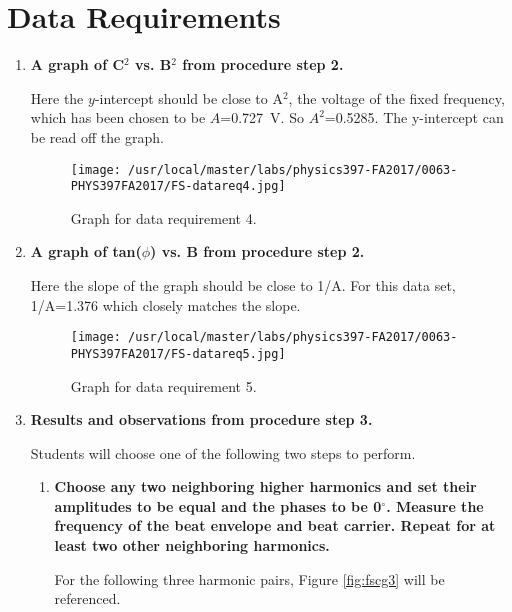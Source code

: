 \section{Data Requirements}
\begin{enumerate}[resume]
\item {\bf A graph of C$^2$ vs. B$^2$ from procedure step 2.}\newline

Here the $y$-intercept should be close to A$^2$, the voltage of the fixed frequency, which has been chosen to be $A$=0.727~V. So $A^2$=0.5285. The y-intercept can be read off the graph.

\begin{figure}[ht]
\texttt{[image: /usr/local/master/labs/physics397-FA2017/0063-PHYS397FA2017/FS-datareq4.jpg]}
\caption{Graph for data requirement 4.}
\label{fig:fscg1}
\end{figure}\vspace{-10mm}

\item {\bf A graph of tan($\phi$) vs. B from procedure step 2.}\newline

Here the slope of the graph should be close to 1/A. For this data set, 1/A=1.376 which closely matches the slope.

\begin{figure}[ht]
\texttt{[image: /usr/local/master/labs/physics397-FA2017/0063-PHYS397FA2017/FS-datareq5.jpg]}
\caption{Graph for data requirement 5.}
\label{fig:fscg2}
\end{figure}

\item {\bf Results and observations from procedure step 3.}\newline

Students will choose one of the following two steps to perform.\newline
\begin{enumerate}[label=(\Alph*)]
\item {\bf Choose any two neighboring higher harmonics and set their amplitudes to be equal and the phases to be 0$^{\circ}$. Measure the frequency of the beat envelope and beat carrier. Repeat for at least two other neighboring harmonics.}\newline

For the following three harmonic pairs, Figure \ref{fig:fscg3} will be referenced.


\end{enumerate}
\end{enumerate}
